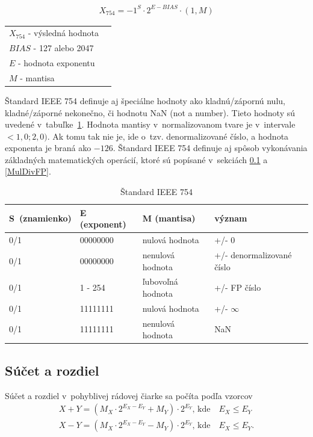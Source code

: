 \begin{eqnarray}
X_{754} = -1^{S}\cdot 2^{E-BIAS}\cdot (1,M)
\end{eqnarray}

\begin{tabular}{ll}
$ X_{754} $ - výsledná hodnota \\
$ BIAS $ - 127 alebo 2047 \\
$ E $ - hodnota exponentu \\
$ M $ - mantisa \\
\end{tabular}
\bigskip

Štandard IEEE 754 definuje aj špeciálne hodnoty ako kladnú/zápornú nulu, kladné/záporné nekonečno, či hodnotu NaN (not a number). Tieto hodnoty sú uvedené v~tabuľke~\ref{standard_IEEE754}.
Hodnota mantisy v~normalizovanom tvare je v~intervale $ <1,0; 2,0) $. Ak tomu tak nie je, ide o~tzv. denormalizované číslo, a hodnota exponenta je braná ako $ -126 $. Štandard IEEE 754 definuje aj spôsob vykonávania základných matematických operácií, ktoré sú popísané v~sekciách \ref{PlusMinusFP} a \ref{MulDivFP}.

\bigskip
\begin{table}[h]
\centering
\begin{tabular}{|l|l|l|l|}
\hline
\rowcolor[HTML]{68CBD0} 
S~(znamienko) & E (exponent) & M (mantisa)       & význam                    \\ \hline
0/1           & 00000000     & nulová hodnota    & +/- 0                     \\ \hline
0/1           & 00000000     & nenulová hodnota  & +/- denormalizované číslo \\ \hline
0/1           & 1 - 254      & ľubovoľná hodnota & +/- FP číslo              \\ \hline
0/1           & 11111111     & nulová hodnota    & +/- $ \infty  $           \\ \hline
0/1           & 11111111     & nenulová hodnota  & NaN                       \\ \hline
\end{tabular}
\caption{Štandard IEEE 754 \cite{FPOnline}}
\label{standard_IEEE754}
\end{table}

\newpage
\subsection{Súčet a rozdiel} \label{PlusMinusFP}
Súčet a rozdiel v~pohyblivej rádovej čiarke sa počíta podľa vzorcov
\begin{eqnarray}
X + Y = (M_{X}\cdot 2^{E_{X} - E_{Y}} + M_{Y})\cdot 2^{E_{Y}} \text{, kde} \quad E_{X} \leq E_{Y} \\
X - Y = (M_{X}\cdot 2^{E_{X} - E_{Y}} - M_{Y})\cdot 2^{E_{Y}} \text{, kde} \quad E_{X} \leq E_{Y} .
\end{eqnarray}

